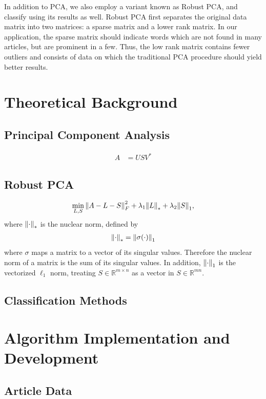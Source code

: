 \documentclass[12pt]{article}
\newcommand{\R}{\mathbb{R}}
\begin{document}
In addition to PCA, we also employ a variant known as Robust PCA, and classify using its results as well. Robust PCA first separates the original data matrix into two matrices: a sparse matrix and a lower rank matrix. In our application, the sparse matrix should indicate words which are not found in many articles, but are prominent in a few. Thus, the low rank matrix contains fewer outliers  and consists of data on which the traditional PCA procedure should yield better results. 


\section{Theoretical Background}

\subsection{Principal Component Analysis}
\begin{align}
A &= U S V^*
\label{eq:svd}
\end{align}

\subsection{Robust PCA}
\begin{align}
\min_{L,S} \norm{A-L-S}_{F}^2 + \lambda_1 \norm{L}_* + \lambda_2 \norm{S}_1,
\label{eq:robust_obj}
\end{align}
where $\norm{\cdot}_*$ is the nuclear norm, defined by
\begin{align*}
\norm{\cdot}_* = \norm{\sigma(\cdot)}_1
\end{align*}
where $\sigma$ maps a matrix to a vector of its singular values. Therefore the nuclear norm of a matrix is the sum of its singular values. In addition, $\norm{\cdot}_1$ is the vectorized $\ell_1$ norm, treating $S \in \R^{m \times n}$ as a vector in $S \in \R^{mn}.$

\subsection{Classification Methods}
\section{Algorithm Implementation and Development}

\subsection{Article Data}
\end{document}
